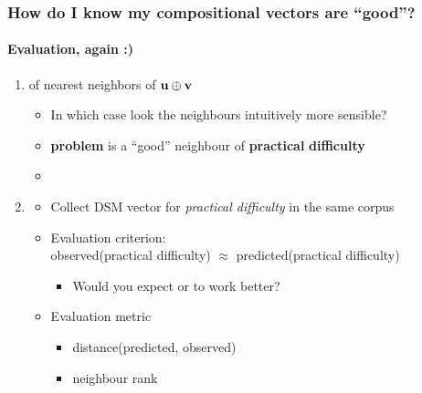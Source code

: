 \documentclass[t]{beamer} %
\begin{document}

\begin{frame}
  \frametitle{How do I know my compositional vectors are ``good''?}
  \framesubtitle{Evaluation, again :)}

  \begin{enumerate}
  \item {} of nearest neighbors of $\vu \oplus \vv$
    \begin{itemize}
    \item In which case look the neighbours intuitively more sensible?
    \item \textbf{problem} is a ``good'' neighbour of \textbf{practical} \primary{$\oplus$} \textbf{difficulty}
    \item[]
    \end{itemize}
    
  \item<2-> 
    \begin{itemize}
    \item Collect DSM vector for \emph{practical difficulty} in the same corpus\\[4pt]
    \item Evaluation criterion:\\
      observed(practical difficulty) $\approx$ predicted(practical difficulty)
      \begin{itemize}
      \item Would you expect \primary{+} or \primary{$\odot$} to work better?
      \end{itemize}
    \item Evaluation metric
      \begin{itemize}
      \item distance(predicted, observed) \citep{Lazaridou:etc:13}
      \item neighbour rank \citep{Baroni:Zamparelli:10,Pado:etc:16}
      \end{itemize}
    \end{itemize}
  \end{enumerate}
\end{frame}
\end{document}
